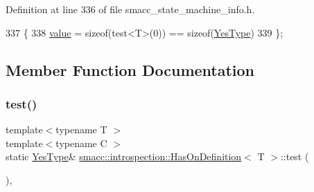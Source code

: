 Definition at line 336 of file smacc\+\_\+state\+\_\+machine\+\_\+info.\+h.


\begin{DoxyCode}
337     \{
338         \hyperlink{classsmacc_1_1introspection_1_1HasOnDefinition_ab40a368fd2564562bf0107984f5f197da2c667ca4893ef31062bc9864e4d06ab2}{value} = \textcolor{keyword}{sizeof}(test<T>(0)) == \textcolor{keyword}{sizeof}(\hyperlink{classsmacc_1_1introspection_1_1HasOnDefinition_ad18cda8f47c5a0e9660b7c7ca54d98c7}{YesType})
339     \};
\end{DoxyCode}


\subsection{Member Function Documentation}
\mbox{\label{classsmacc_1_1introspection_1_1HasOnDefinition_a9271922a017eed3dc8d9ef931239ca3d}} 
\subsubsection{\texorpdfstring{test()}{test()}\hspace{0.1cm}{\footnotesize\ttfamily [1/2]}}
{\footnotesize\ttfamily template$<$typename T $>$ \\
template$<$typename C $>$ \\
static \hyperlink{classsmacc_1_1introspection_1_1HasOnDefinition_ad18cda8f47c5a0e9660b7c7ca54d98c7}{Yes\+Type}\& \hyperlink{classsmacc_1_1introspection_1_1HasOnDefinition}{smacc\+::introspection\+::\+Has\+On\+Definition}$<$ T $>$\+::test (\begin{DoxyParamCaption}\item[{decltype \&\+::static\+Configure}]{ }\end{DoxyParamCaption})\hspace{0.3cm}{\ttfamily [static]}, {\ttfamily [private]}}

\mbox{\label{classsmacc_1_1introspection_1_1HasOnDefinition_a22cbbab4a5ce8f1b85cfd98a374f7f49}} 
